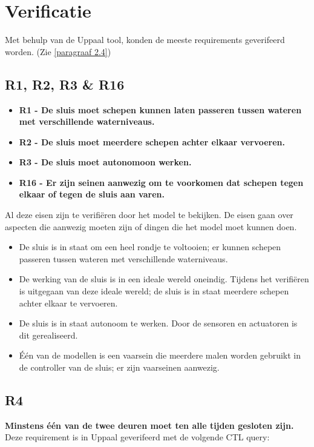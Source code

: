 \documentclass{article} %
\begin{document}
\newpage

\section{Verificatie}

Met behulp van de Uppaal tool, konden de meeste requirements geverifeerd worden. (Zie \ref{paragraaf 2.4})

\subsection{R1, R2, R3 \& R16}
\begin{itemize}
    \item \textbf{R1 - De sluis moet schepen kunnen laten passeren tussen wateren met verschillende waterniveaus.}
    \item \textbf{R2 - De sluis moet meerdere schepen achter elkaar vervoeren.}
    \item \textbf{R3 - De sluis moet autonomoon werken.}
    \item \textbf{R16 - Er zijn seinen aanwezig om te voorkomen dat schepen tegen elkaar of tegen de sluis aan varen.}
\end{itemize}

Al deze eisen zijn te verifiëren door het model te bekijken. De eisen gaan over aspecten die aanwezig moeten zijn of dingen die het model moet kunnen doen. 
\begin{itemize}
    \item De sluis is in staat om een heel rondje te voltooien; er kunnen schepen passeren tussen wateren met verschillende waterniveaus.
    \item De werking van de sluis is in een ideale wereld oneindig. Tijdens het verifiëren is uitgegaan van deze ideale wereld; de sluis is in staat meerdere schepen achter elkaar te vervoeren.
    \item De sluis is in staat autonoom te werken. Door de sensoren en actuatoren is dit gerealiseerd.
    \item Één van de modellen is een vaarsein die meerdere malen worden gebruikt in de controller van de sluis; er zijn vaarseinen aanwezig.
\end{itemize}

\subsection{R4}
\textbf{Minstens één van de twee deuren moet ten alle tijden gesloten zijn.} \\
Deze requirement is in Uppaal geverifeerd met de volgende CTL query:
\end{document}
